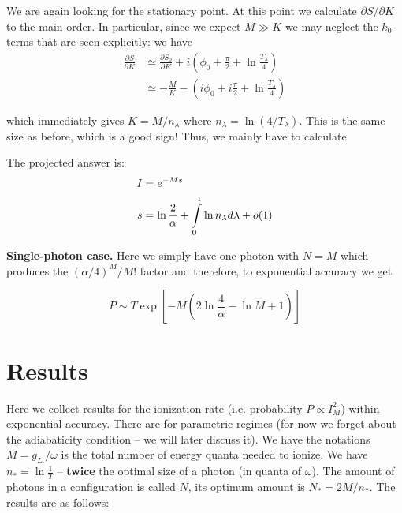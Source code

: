 We are again looking for the stationary point. At this point we calculate
$\partial S/\partial K$ to the main order. In particular, since we
expect $M\gg K$ we may neglect the $k_{0}$-terms that are seen explicitly:
we have
\begin{align*}
\frac{\partial S}{\partial K} & \simeq\frac{\partial S_{0}}{\partial K}+i\left(\phi_{0}+\frac{\pi}{2}+\ln\frac{T_{\lambda}}{4}\right)\\
& \simeq-\frac{M}{K}-\left(i\phi_{0}+i\frac{\pi}{2}+\ln\frac{T_{\lambda}}{4}\right)
\end{align*}

which immediately gives $K=M/n_{\lambda}$ where $n_{\lambda}=\ln(4/T_{\lambda})$.
This is the same size as before, which is a good sign! Thus, we mainly
have to calculate

The projected answer is:
\begin{align*}
I & =e^{-Ms}\\
s & =\ln\frac{2}{\alpha}+\intop_{0}^{1}\ln n_{\lambda}d\lambda+o(1)
\end{align*}

\textbf{Single-photon case.} Here we simply have one photon with $N=M$
which produces the $(\alpha/4)^{M}/M!$ factor and therefore, to exponential
accuracy we get

\[
P\sim T\exp\left[-M\left(2\ln\frac{4}{\alpha}-\ln M+1\right)\right]
\]


\section{Results}

Here we collect results for the ionization rate (i.e. probability
$P\propto I_{M}^{2}$) within exponential accuracy. There are for
parametric regimes (for now we forget about the adiabaticity condition
-- we will later discuss it). We have the notations $M=g_{L.}/\omega$
is the total number of energy quanta needed to ionize. We have $n_{*}=\ln\frac{1}{T}$
-- \textbf{twice} the optimal size of a photon (in quanta of $\omega$).
The amount of photons in a configuration is called $N$, its optimum
amount is $N_{*}=2M/n_{*}$. The results are as follows:

